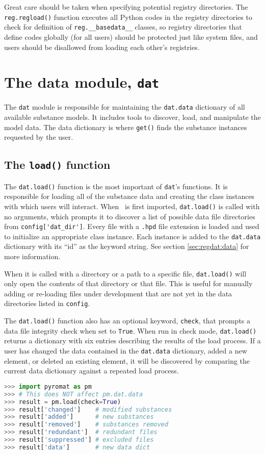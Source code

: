 Great care should be taken when specifying potential registry directories.  The \texttt{reg.regload()} function executes all Python codes in the registry directories to check for definition of \verb|reg.__basedata__| classes, so registry directories that define codes globally (for all users) should be protected just like system files, and users should be disallowed from loading each other's registries.

\section{The data module, \texttt{dat}}

The \texttt{dat} module is responsible for maintaining the \texttt{dat.data} dictionary of all available substance models.  It includes tools to discover, load, and manipulate the model data.  The data dictionary is where \texttt{get()} finds the substance instances requested by the user.

\subsection{The \texttt{load()} function}\label{sec:regdat:load}

The \texttt{dat.load()} function is the most important of \texttt{dat}'s functions.  It is responsible for loading all of the substance data and creating the class instances with which users will interact.  When \PM\ is first imported, \texttt{dat.load()} is called with no arguments, which prompts it to discover a list of possible data file directories from \verb|config['dat_dir']|.  Every file with a \texttt{.hpd} file extension is loaded and used to initialize an appropriate class instance.  Each instance is added to the \texttt{dat.data} dictionary with its ``id'' as the keyword string.  See section \ref{sec:regdat:data} for more information.

When it is called with a directory or a path to a specific file, \texttt{dat.load()} will only open the contents of that directory or that file.  This is useful for manually adding or re-loading files under development that are not yet in the data directories listed in \texttt{config}.

The \texttt{dat.load()} function also has an optional keyword, \texttt{check}, that prompts a data file integrity check when set to \texttt{True}.  When run in check mode, \texttt{dat.load()} returns a dictionary with six entries describing the results of the load process.  If a user has changed the data contained in the \texttt{dat.data} dictionary, added a new element, or deleted an existing element, it will be discovered by comparing the current data dictionary against a repeated load process.
\begin{lstlisting}[language=Python]
>>> import pyromat as pm
>>> # This does NOT affect pm.dat.data
>>> result = pm.load(check=True)
>>> result['changed']    # modified substances
>>> result['added']      # new substances
>>> result['removed']    # substances removed 
>>> result['redundant']  # redundant files
>>> result['suppressed'] # excluded files
>>> result['data']       # new data dict
\end{lstlisting}

